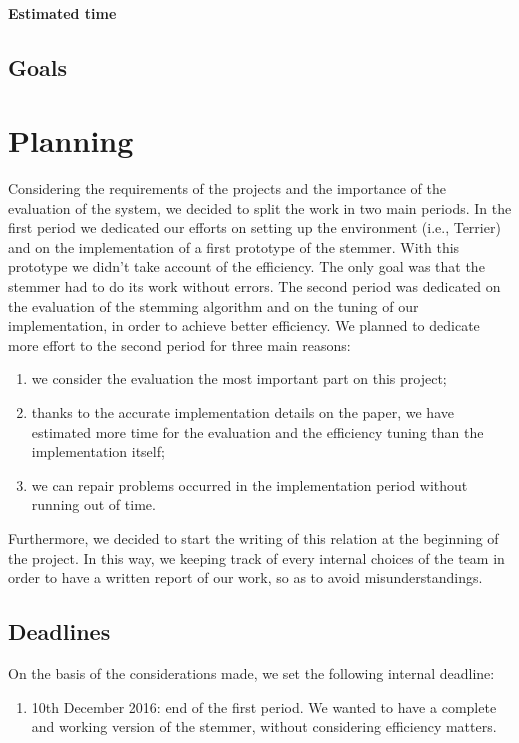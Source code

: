 \documentclass[10pt,a4paper]{article}
\begin{document}
\paragraph{Estimated time}

\subsection{Goals}
\section{Planning}
Considering the requirements of the projects and the importance of the evaluation of the system, we decided to split the work in two main periods.
In the first period we dedicated our efforts on setting up the environment (i.e., Terrier) and on the implementation of a first prototype of the stemmer. With this prototype we didn't take account of the efficiency. The only goal was that the stemmer had to do its work without errors. The second period was dedicated on the evaluation of the stemming algorithm and on the tuning of our implementation, in order to achieve better efficiency. We planned to dedicate more effort to the second period for three main reasons:
\begin{enumerate}
\item we consider the evaluation the most important part on this project;
\item thanks to the accurate implementation details on the paper, we have estimated more time for the evaluation and the efficiency tuning than the implementation itself;
\item we can repair problems occurred in the implementation period without running out of time.
\end{enumerate}

Furthermore, we decided to start the writing of this relation at the beginning of the project. In this way, we keeping track of every internal choices of the team in order to have a written report of our work, so as to avoid misunderstandings.
\subsection{Deadlines}
On the basis of the considerations made, we set the following internal deadline:
\begin{enumerate}[label=\textbf{D.\arabic*}]
\item \label{10December} 10th December 2016: end of the first period. We wanted to have a complete and working version of the stemmer, without considering efficiency matters.
\end{enumerate}
\end{document}
